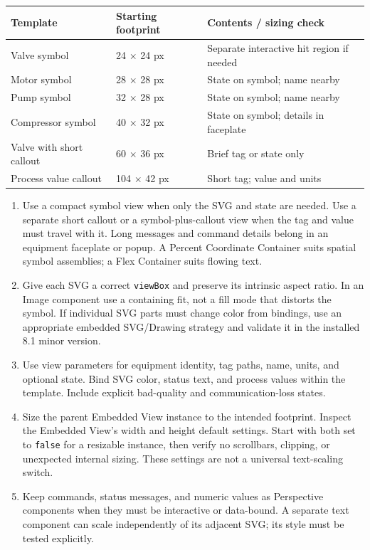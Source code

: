 \begin{center}
\begin{tabular}{@{}p{5.05cm}p{3.73cm}p{6.86cm}@{}}
\toprule
Template & Starting footprint & Contents / sizing check\\ \midrule
Valve symbol & 24 $\times$ 24 px & Separate interactive hit region if needed\\
Motor symbol & 28 $\times$ 28 px & State on symbol; name nearby\\
Pump symbol & 32 $\times$ 28 px & State on symbol; name nearby\\
Compressor symbol & 40 $\times$ 32 px & State on symbol; details in faceplate\\
Valve with short callout & 60 $\times$ 36 px & Brief tag or state only\\
Process value callout & 104 $\times$ 42 px & Short tag; value and units\\
\bottomrule
\end{tabular}
\end{center}

\begin{enumerate}[leftmargin=*,itemsep=3pt]
\item Use a compact symbol view when only the SVG and state are needed. Use a separate short callout or a symbol-plus-callout view when the tag and value must travel with it. Long messages and command details belong in an equipment faceplate or popup. A Percent Coordinate Container suits spatial symbol assemblies; a Flex Container suits flowing text.
\item Give each SVG a correct \texttt{viewBox} and preserve its intrinsic aspect ratio. In an Image component use a containing fit, not a fill mode that distorts the symbol. If individual SVG parts must change color from bindings, use an appropriate embedded SVG/Drawing strategy and validate it in the installed 8.1 minor version.
\item Use view parameters for equipment identity, tag paths, name, units, and optional state. Bind SVG color, status text, and process values within the template. Include explicit bad-quality and communication-loss states.
\item Size the parent Embedded View instance to the intended footprint. Inspect the Embedded View's width and height default settings. Start with both set to \texttt{false} for a resizable instance, then verify no scrollbars, clipping, or unexpected internal sizing. These settings are not a universal text-scaling switch.
\item Keep commands, status messages, and numeric values as Perspective components when they must be interactive or data-bound. A separate text component can scale independently of its adjacent SVG; its style must be tested explicitly.
\end{enumerate}

